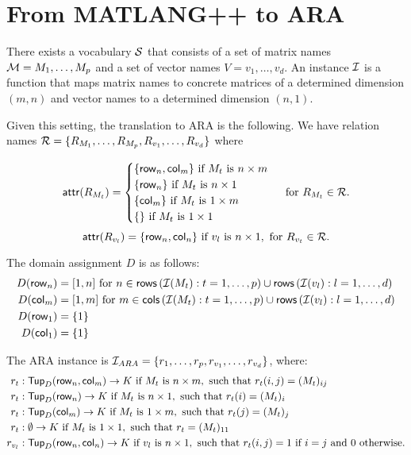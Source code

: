 \newcommand{\row}{\mathsf{row}}
\newcommand{\rows}{\mathsf{rows}}
\newcommand{\col}{\mathsf{col}}
\newcommand{\cols}{\mathsf{cols}}

\section{From MATLANG++ to ARA}

There exists a vocabulary $\mathcal{S}$ that consists of a set of matrix names $\mathcal{M}=M_1,\ldots, M_p$ and a set of vector names $V=v_1,\ldots, v_d$. An instance $\mathcal{I}$ is a function that maps matrix names to concrete matrices of a determined dimension $(m,n)$ and vector names to a determined dimension $(n, 1)$.

Given this setting, the translation to ARA is the following. We have relation names $ \mathcal{R}=\lbrace R_{M_1}, \ldots, R_{M_p}, R_{v_1}, \ldots, R_{v_d}\rbrace$ where 

\[
	\attr{R_{M_t}} = \begin{cases}
		\lbrace\row_n,\col_m \rbrace \text{ if } M_t \text{ is } n\times m \\
		\lbrace\row_n \rbrace \text{ if } M_t \text{ is } n\times 1 \\
		\lbrace\col_m \rbrace \text{ if } M_t \text{ is } 1\times m \\
		\lbrace\rbrace \text{ if } M_t \text{ is } 1\times 1 \\
	\end{cases} \text{ for } R_{M_t}\in\cR.
\]
$$\attr{R_{v_l}} = \lbrace\row_n,\col_n \rbrace \text{ if } v_l \text{ is } n\times 1, \text{ for } R_{v_t}\in\cR.$$

The domain assignment $D$ is as follows:
\begin{align*}
	D(\row_n)&=[1, n]\text{ for } n\in\rows\left( \cI(M_t): t=1,\ldots, p\right)\cup\rows\left( \cI(v_l): l=1,\ldots, d\right) \\
	D(\col_m)&=[1, m]\text{ for } m\in\cols\left( \cI(M_t): t=1,\ldots, p\right)\cup\rows\left( \cI(v_l): l=1,\ldots, d\right) \\
	D(\row_1) &=\lbrace 1\rbrace \\
	D(\col_1) &=\lbrace 1\rbrace
\end{align*}

The ARA instance is $\mathcal{I}_{ARA}=\lbrace r_1,\ldots,r_p,r_{v_1},\ldots, r_{v_d}\rbrace$, where:
\begin{align*}
r_t&: \Tup_D(\row_n,\col_m)\rightarrow K \text{ if }  M_t \text{ is } n\times m, \text{ such that } r_t(i,j)=(M_t)_{ij} \\
r_t&: \Tup_D(\row_n)\rightarrow K \text{ if }  M_t \text{ is } n\times 1, \text{ such that } r_t(i)=(M_t)_{i} \\
r_t&: \Tup_D(\col_m)\rightarrow K \text{ if }  M_t \text{ is } 1\times m, \text{ such that } r_t(j)=(M_t)_{j} \\
r_t&: \emptyset\rightarrow K \text{ if }  M_t \text{ is } 1\times 1, \text{ such that } r_t=(M_t)_{11} \\
r_{v_l}&: \Tup_D(\row_n,\col_n)\rightarrow K \text{ if }  v_l \text{ is } n\times 1, \text{ such that } r_t(i,j)=1 \text{ if } i=j \text{ and } 0 \text{ otherwise.}
\end{align*}

